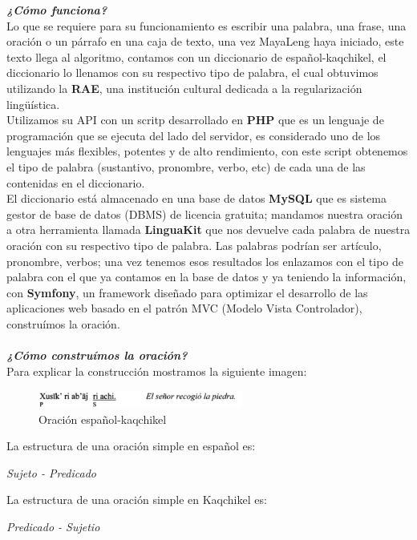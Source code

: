 \documentclass[a4paper,openright,11pt]{article}
\begin{document}
\textbf{\textit{¿Cómo funciona?}}\\
Lo que se requiere para su funcionamiento es escribir una palabra, una frase, una oración o un párrafo en una caja de texto, una vez MayaLeng haya iniciado, este texto llega al algoritmo, contamos con un diccionario de español-kaqchikel, el diccionario lo llenamos con su respectivo tipo de palabra, el cual obtuvimos utilizando la \textbf{RAE}, una institución cultural dedicada a la regularización lingüística.\\ 
Utilizamos su API con un scritp desarrollado en \textbf{PHP} que es un lenguaje de programación que se ejecuta del lado del servidor, es considerado uno de los lenguajes más flexibles, potentes y de alto rendimiento,  con este script obtenemos el tipo de palabra (sustantivo, pronombre, verbo, etc) de cada una de las contenidas en el diccionario.\\ 
El diccionario está almacenado en una base de datos \textbf{MySQL} que es sistema gestor de base de datos (DBMS) de licencia gratuita; mandamos nuestra oración a otra herramienta llamada \textbf{LinguaKit} que nos devuelve cada palabra de nuestra oración con su respectivo tipo de palabra. Las palabras podrían ser artículo, pronombre, verbos; una vez tenemos esos resultados los enlazamos con el tipo de palabra con el que ya contamos en la base de datos y ya teniendo la información, con \textbf{Symfony}, un framework diseñado para optimizar el desarrollo de las aplicaciones web basado en el patrón MVC (Modelo Vista Controlador), construímos la oración.\\\\

\textit{\textbf{¿Cómo construímos la oración?}}\\
Para explicar la construcción mostramos la siguiente imagen:\\
\begin{figure}[H]
	\centering
	\includegraphics[width=0.6\textwidth]{oracion}
	\caption{Oración español-kaqchikel}
	\label{fig:kaq}
\end{figure}
La estructura de una oración simple en español es:
\begin{center}
	\textit{Sujeto - Predicado}\\
\end{center}

La estructura de una oración simple en Kaqchikel es:
\begin{center}
	\textit{Predicado - Sujetio}\\
\end{center}
\end{document}
